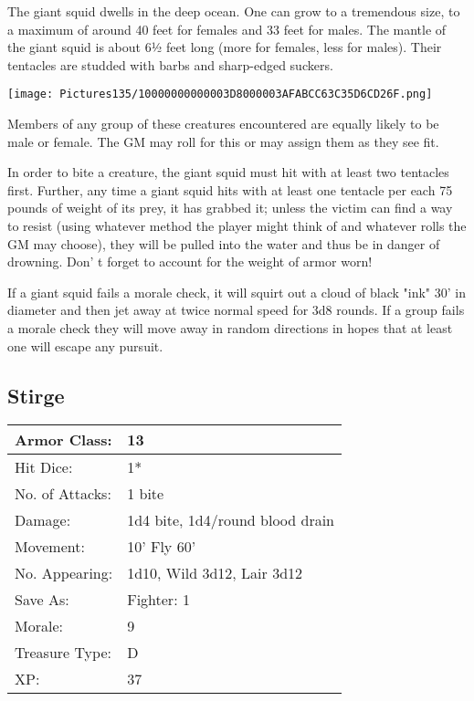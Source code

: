 \documentclass[a4paper,twoside,openany,10pt]{book}
\begin{document}
\begin{multicols}{2}
The
giant squid dwells in the deep ocean. One can grow to a tremendous size, to a maximum of around 40 feet for females and 33 feet for males. The mantle of the giant squid is about 6½ feet long (more for females, less for males). Their tentacles are studded with barbs and sharp-edged suckers.


\begin{center} \texttt{[image: Pictures135/10000000000003D8000003AFABCC63C35D6CD26F.png]} \end{center}

Members of any group of these creatures encountered are equally likely to be male or female. The GM may roll for this or may assign them as they see fit.

In order to bite a creature, the giant squid must hit with at least two tentacles first. Further, any time a giant squid hits with at least one tentacle per each 75 pounds of weight of its prey, it has grabbed it; unless the victim can find a way to resist (using whatever method the player might think of and whatever rolls the GM may choose), they will be pulled into the water and thus be in danger of drowning. Don' t forget to account for the weight of armor worn!

If a giant squid fails a morale check, it will squirt out a cloud of black "ink" 30' in diameter and then jet away at twice normal speed for 3d8 rounds. If a group fails a morale check they will move away in random directions in hopes that at least one will escape any pursuit.

\subsection*{Stirge}\label{stirge}

\begin{tabularx}{0.50\textwidth}{@{}lX@{}}
Armor Class: & 13 \\\hline
Hit Dice: & 1* \\\hline
No. of Attacks: & 1 bite \\\hline
Damage: & 1d4 bite, 1d4/round blood drain \\\hline
Movement: & 10' Fly 60' \\\hline
No. Appearing: & 1d10, Wild 3d12, Lair 3d12 \\\hline
Save As: & Fighter: 1 \\\hline
Morale: & 9 \\\hline
Treasure Type: & D \\\hline
XP: & 37 \\\hline
\end{tabularx}\medskip


\end{multicols}
\end{document}
